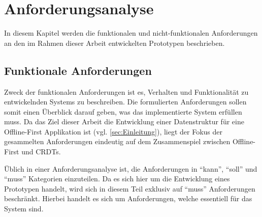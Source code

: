 \documentclass[a4paper, 12pt]{scrreprt}
\begin{document}
\section{Anforderungsanalyse}
\label{sec:anforderungsanalyse}

In diesem Kapitel werden die funktionalen und nicht-funktionalen Anforderungen an den im Rahmen dieser Arbeit entwickelten Prototypen beschrieben.

\subsection{Funktionale Anforderungen}
Zweck der funktionalen Anforderungen ist es, Verhalten und Funktionalität zu entwickelnden Systems zu beschreiben. Die formulierten Anforderungen sollen somit einen Überblick darauf geben, was das implementierte System erfüllen muss. Da das Ziel dieser Arbeit die Entwicklung einer Datenstruktur für eine Offline-First Applikation ist (vgl. \ref{sec:Einleitung}), liegt der Fokus der gesammelten Anforderungen eindeutig auf dem Zusammenspiel zwischen Offline-First und CRDTs.

Üblich in einer Anforderungsanalyse ist, die Anforderungen in \enquote{kann}, \enquote{soll} und \enquote{muss} Kategorien einzuteilen. Da es sich hier um die Entwicklung eines Prototypen handelt, wird sich in diesem Teil exklusiv auf \enquote{muss} Anforderungen beschränkt. Hierbei handelt es sich um Anforderungen, welche essentiell für das System sind.
\end{document}
